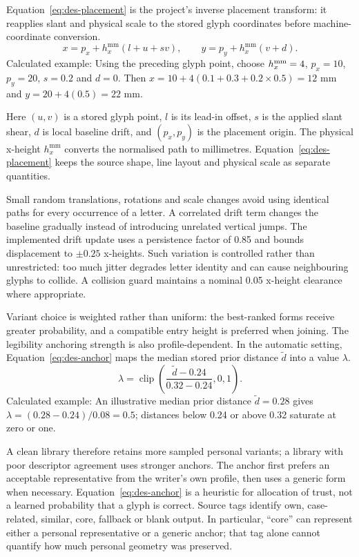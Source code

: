 Equation~\ref{eq:des-placement} is the project's inverse placement transform: it reapplies slant and physical scale to the stored glyph coordinates before machine-coordinate conversion.
\begin{equation}
x=p_x+h_x^{\mathrm{mm}}(l+u+sv),\qquad
y=p_y+h_x^{\mathrm{mm}}(v+d).
\label{eq:des-placement}
\end{equation}
Calculated example: Using the preceding glyph point, choose $h_x^{\rm mm}=4$, $p_x=10$, $p_y=20$, $s=0.2$ and $d=0$. Then $x=10+4(0.1+0.3+0.2\times0.5)=12$ mm and $y=20+4(0.5)=22$ mm.

Here $(u,v)$ is a stored glyph point, $l$ is its lead-in offset, $s$ is the applied slant shear, $d$ is local baseline drift, and $(p_x,p_y)$ is the placement origin. The physical x-height $h_x^{\mathrm{mm}}$ converts the normalised path to millimetres. Equation~\ref{eq:des-placement} keeps the source shape, line layout and physical scale as separate quantities.

Small random translations, rotations and scale changes avoid using identical paths for every occurrence of a letter. A correlated drift term changes the baseline gradually instead of introducing unrelated vertical jumps. The implemented drift update uses a persistence factor of 0.85 and bounds displacement to $\pm0.25$ x-heights. Such variation is controlled rather than unrestricted: too much jitter degrades letter identity and can cause neighbouring glyphs to collide. A collision guard maintains a nominal 0.05 x-height clearance where appropriate.

Variant choice is weighted rather than uniform: the best-ranked forms receive greater probability, and a compatible entry height is preferred when joining. The legibility anchoring strength is also profile-dependent. In the automatic setting, Equation~\ref{eq:des-anchor} maps the median stored prior distance $\widetilde d$ into a value $\lambda$.
\begin{equation}
\lambda=\operatorname{clip}\left(\frac{\widetilde d-0.24}{0.32-0.24},0,1\right).
\label{eq:des-anchor}
\end{equation}
Calculated example: An illustrative median prior distance $\widetilde d=0.28$ gives $\lambda=(0.28-0.24)/0.08=0.5$; distances below 0.24 or above 0.32 saturate at zero or one.

A clean library therefore retains more sampled personal variants; a library with poor descriptor agreement uses stronger anchors. The anchor first prefers an acceptable representative from the writer's own profile, then uses a generic form when necessary. Equation~\ref{eq:des-anchor} is a heuristic for allocation of trust, not a learned probability that a glyph is correct. Source tags identify own, case-related, similar, core, fallback or blank output. In particular, ``core'' can represent either a personal representative or a generic anchor; that tag alone cannot quantify how much personal geometry was preserved.

